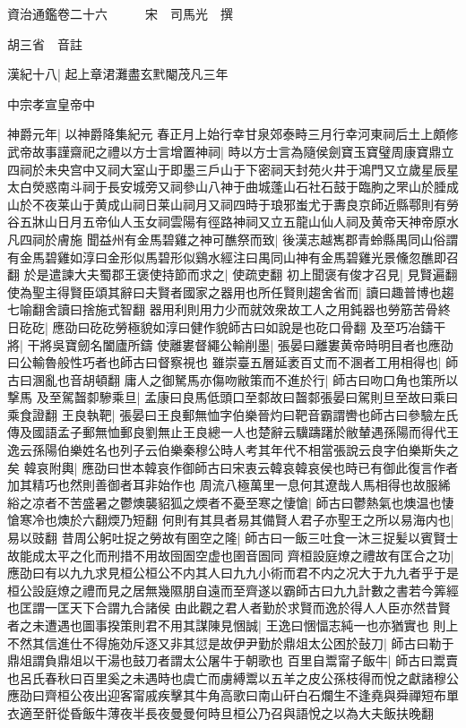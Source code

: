 資治通鑑卷二十六　　　宋　司馬光　撰

胡三省　音註

漢紀十八|{
	起上章涒灘盡玄黓閹茂凡三年}


中宗孝宣皇帝中

神爵元年|{
	以神爵降集紀元}
春正月上始行幸甘泉郊泰畤三月行幸河東祠后土上頗修武帝故事謹齋祀之禮以方士言增置神祠|{
	時以方士言為隨侯劍寶玉寶璧周康寶鼎立四祠於未央宫中又祠大室山于即墨三戶山于下密祠天封苑火井于鴻門又立歲星辰星太白熒惑南斗祠于長安城旁又祠參山八神于曲城蓬山石社石鼓于臨朐之罘山於腄成山於不夜莱山于黄成山祠日莱山祠月又祠四時于琅邪蚩尤于夀良京師近縣鄠則有勞谷五牀山日月五帝仙人玉女祠雲陽有徑路神祠又立五龍山仙人祠及黄帝天神帝原水凡四祠於膚施}
聞益州有金馬碧雞之神可醮祭而致|{
	後漢志越嶲郡青蛉縣禺同山俗謂有金馬碧雞如淳曰金形似馬碧形似鷄水經注曰禺同山神有金馬碧雞光景儵忽醮即召翻}
於是遣諫大夫蜀郡王褒使持節而求之|{
	使疏吏翻}
初上聞褒有俊才召見|{
	見賢遍翻}
使為聖主得賢臣頌其辭曰夫賢者國家之器用也所任賢則趨舍省而|{
	讀曰趣普博也趨七喻翻舍讀曰捨施式智翻}
器用利則用力少而就效衆故工人之用鈍器也勞筋苦骨終日矻矻|{
	應劭曰矻矻勞極貌如淳曰健作貌師古曰如說是也矻口骨翻}
及至巧冶鑄干將|{
	干將吳寶劒名闔廬所鑄}
使離婁督繩公輸削墨|{
	張晏曰離婁黄帝時明目者也應劭曰公輸魯般性巧者也師古曰督察視也}
雖崇臺五層延袤百丈而不溷者工用相得也|{
	師古曰溷亂也音胡頓翻}
庸人之御駑馬亦傷吻敝策而不進於行|{
	師古曰吻口角也策所以撃馬}
及至駕齧厀驂乘旦|{
	孟康曰良馬低頭口至䣛故曰齧䣛張晏曰駕則旦至故曰乘曰乘食證翻}
王良執靶|{
	張晏曰王良郵無恤字伯樂晉灼曰靶音霸謂轡也師古曰參驗左氏傳及國語孟子郵無恤郵良劉無止王良總一人也楚辭云驥躊躇於敝輦遇孫陽而得代王逸云孫陽伯樂姓名也列子云伯樂秦穆公時人考其年代不相當張說云良字伯樂斯失之矣}
韓哀附輿|{
	應劭曰世本韓哀作御師古曰宋衷云韓哀韓哀侯也時已有御此復言作者加其精巧也然則善御者耳非始作也}
周流八極萬里一息何其遼哉人馬相得也故服絺綌之凉者不苦盛暑之鬱燠襲貂狐之煗者不憂至寒之悽愴|{
	師古曰鬱熱氣也燠温也悽愴寒冷也燠於六翻煗乃短翻}
何則有其具者易其備賢人君子亦聖王之所以易海内也|{
	易以豉翻}
昔周公躬吐捉之勞故有圉空之隆|{
	師古曰一飯三吐食一沐三捉髪以賓賢士故能成太平之化而刑措不用故囹圄空虚也圉音圄同}
齊桓設庭燎之禮故有匡合之功|{
	應劭曰有以九九求見桓公桓公不内其人曰九九小術而君不内之况大于九九者乎于是桓公設庭燎之禮而見之居無幾隰朋自遠而至齊遂以霸師古曰九九計數之書若今筭經也匡謂一匡天下合謂九合諸侯}
由此觀之君人者勤於求賢而逸於得人人臣亦然昔賢者之未遭遇也圖事揆策則君不用其謀陳見悃誠|{
	王逸曰悃愊志純一也亦猶實也}
則上不然其信進仕不得施効斥逐又非其愆是故伊尹勤於鼎俎太公困於鼔刀|{
	師古曰勒于鼎俎謂負鼎俎以干湯也鼓刀者謂太公屠牛于朝歌也}
百里自鬻甯子飯牛|{
	師古曰鬻賣也呂氏春秋曰百里奚之未遇時也虞亡而虜縛鬻以五羊之皮公孫枝得而悅之獻諸穆公應劭曰齊桓公夜出迎客甯戚疾擊其牛角高歌曰南山矸白石爛生不逢堯與舜禪短布單衣適至骭從昏飯牛薄夜半長夜曼曼何時旦桓公乃召與語悅之以為大夫飯扶晚翻}

